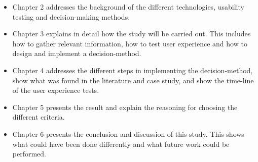 \begin{itemize}
    \item Chapter 2 addresses the background of the different technologies, usability testing and decision-making methods.
    \item Chapter 3 explains in detail how the study will be carried out. This includes how to gather relevant information, how to test user experience and how to design and implement a decision-method.
    \item Chapter 4 addresses the different steps in implementing the decision-method, show what was found in the literature and case study, and show the time-line of the user experience tests.
    \item Chapter 5 presents the result and explain the reasoning for choosing the different criteria.
    \item Chapter 6 presents the conclusion and discussion of this study. This shows what could have been done differently and what future work could be performed.
\end{itemize}
